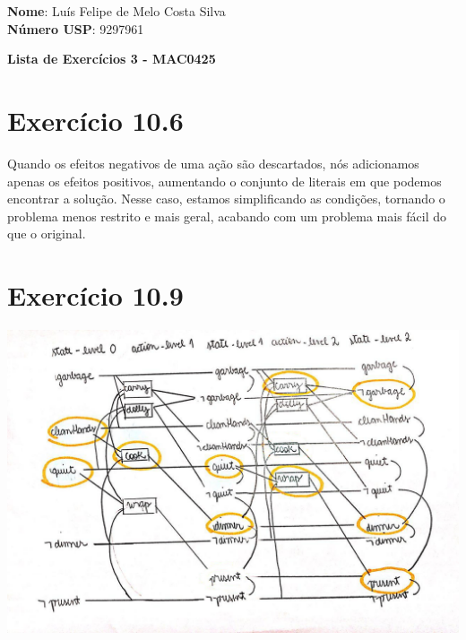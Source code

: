 \documentclass[12pt,letterpaper]{article}
\begin{document}
	\large \textbf{Nome}: Luís Felipe de Melo Costa Silva \\
	\textbf{Número USP}: 9297961

	\begin{center}
		\LARGE \bf
		Lista de Exercícios 3 - MAC0425
	\end{center}

	\section*{Exercício 10.6}

	Quando os efeitos negativos de uma ação são descartados, nós adicionamos apenas os efeitos positivos, aumentando o conjunto de literais em que podemos encontrar a solução. Nesse caso, estamos simplificando as condições, tornando o problema menos restrito e mais geral, acabando com um problema mais fácil do que o original.

	\section*{Exercício 10.9}

	\includegraphics[width=\textwidth]{graphplan.jpg}
\end{document}

